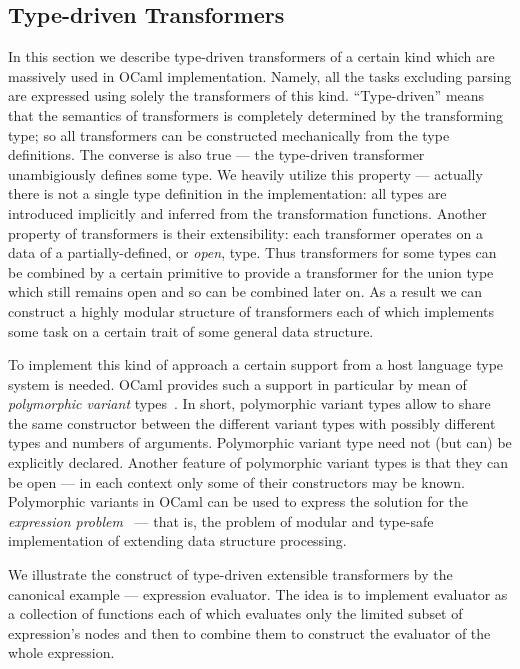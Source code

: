 \subsection{Type-driven Transformers}

In this section we describe type-driven transformers of a certain kind which are 
massively used in OCaml implementation. Namely, all the tasks excluding parsing
are expressed using solely the transformers of this kind. ``Type-driven'' means that
the semantics of transformers is completely determined by the transforming type; 
so all transformers can be constructed mechanically from the type definitions.
The converse is also true --- the type-driven transformer unambigiously defines
some type. We heavily utilize this property --- actually there is not a single 
type definition in the implementation: all types are introduced implicitly 
and inferred from the transformation functions. Another property of transformers
is their extensibility: each transformer operates on a data of a partially-defined, 
or \emph{open}, type. Thus transformers for some types can be combined by a certain primitive
to provide a transformer for the union type which still remains open and so can be
combined later on. As a result we can construct a highly modular structure of
transformers each of which implements some task on a certain trait of some general
data structure. 

To implement this kind of approach a certain support from a host language type 
system is needed. OCaml provides such a support in particular by mean of 
\emph{polymorphic variant} types~\cite{PV}. In short, polymorphic variant types allow to 
share the same constructor between the different variant types with possibly different 
types and numbers of arguments. Polymorphic variant type need not (but can) be explicitly
declared. Another feature of polymorphic variant types is that they can be open --- in each
context only some of their constructors may be known. Polymorphic variants in OCaml 
can be used to express the solution for the \emph{expression problem}~\cite{Exproblem, PVReuse} --- 
that is, the problem of modular and type-safe implementation of extending data structure 
processing. 

We illustrate the construct of type-driven extensible transformers by the canonical
example --- expression evaluator. The idea is to implement evaluator as a
collection of functions each of which evaluates only the limited subset of expression's
nodes and then to combine them to construct the evaluator of the whole expression.

